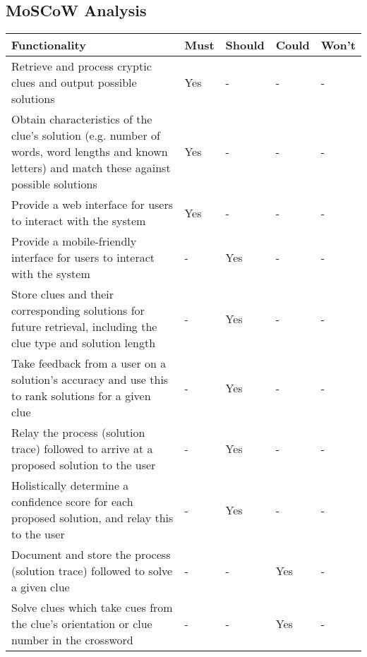 \subsection{MoSCoW Analysis}

\begin{table}[H]
	\centering
	\small
    \begin{tabular}{|p{9.3cm}|p{1.3cm}|p{1.3cm}|p{1.3cm}|p{1.3cm}|}
    \hline
    \textbf{Functionality} & \textbf{Must} & \textbf{Should} & \textbf{Could} & \textbf{Won't} \\ \hline

    Retrieve and process cryptic clues and output possible solutions &
    Yes & - & - & - \\ \hline

    Obtain characteristics of the clue's solution (e.g. number of words, word lengths and known letters) and match these against possible solutions &
    Yes & - & - & - \\ \hline

    Provide a web interface for users to interact with the system &
    Yes & - & - & - \\ \hline

    Provide a mobile-friendly interface for users to interact with the system &
    - & Yes & - & - \\ \hline

    Store clues and their corresponding solutions for future retrieval, including the clue type and solution length &
    - & Yes & - & - \\ \hline

    Take feedback from a user on a solution's accuracy and use this to rank solutions for a given clue &
    - & Yes & - & - \\ \hline

    Relay the process (solution trace) followed to arrive at a proposed solution to the user &
    - & Yes & - & - \\ \hline

    Holistically determine a confidence score for each proposed solution, and relay this to the user &
    - & Yes & - & - \\ \hline

    Document and store the process (solution trace) followed to solve a given clue &
    - & - & Yes & - \\ \hline

    Solve clues which take cues from the clue's orientation or clue number in the crossword &
    - & - & Yes & - \\ \hline


\end{tabular}
\end{table}
